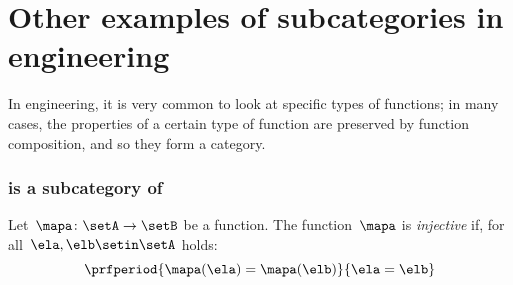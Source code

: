 
\section[Other examples]{Other examples of subcategories in engineering}

In engineering, it is very common to look at specific types of functions; in many cases, the properties of a certain type of function are preserved by function composition, and so they form a category.

\subsubsection{\Injset is a subcategory of \Set}
\begin{definition}
    \label{def:injective-function}
    Let~$\mapa \colon \setA\to \setB$ be a function.
    The function~$\mapa$ is \emph{injective} if, for all~$\ela,\elb\setin \setA$ holds:
    \begin{equation*}
        \prfperiod{\mapa(\ela)=\mapa(\elb)}{\ela=\elb}
    \end{equation*}
\end{definition}

